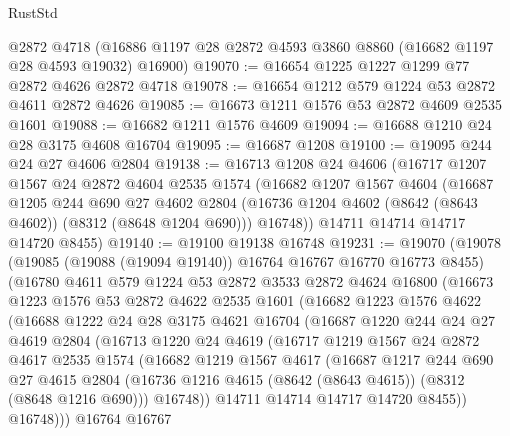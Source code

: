 \begin{lexlean}{RustStd}
\begin{coremodule}
    @2872
    @4718
    (@16886 @1197 @28 @2872 @4593 @3860 @8860 (@16682 @1197 @28 @4593 @19032) @16900)
@19070 := @16654 @1225 @1227 @1299 @77 @2872 @4626 @2872 @4718
@19078 := @16654 @1212 @579 @1224 @53 @2872 @4611 @2872 @4626
@19085 := @16673 @1211 @1576 @53 @2872 @4609 @2535 @1601
@19088 := @16682 @1211 @1576 @4609
@19094 := @16688 @1210 @24 @28 @3175 @4608 @16704
@19095 := @16687 @1208
@19100 := @19095 @244 @24 @27 @4606 @2804
@19138 := @16713
    @1208
    @24
    @4606
    (@16717
      @1207
      @1567
      @24
      @2872
      @4604
      @2535
      @1574
      (@16682
        @1207
        @1567
        @4604
        (@16687
          @1205
          @244
          @690
          @27
          @4602
          @2804
          (@16736 @1204 @4602 (@8642 (@8643 @4602)) (@8312 (@8648 @1204 @690)))
          @16748))
      @14711
      @14714
      @14717
      @14720
      @8455)
@19140 := @19100 @19138 @16748
@19231 := @19070
    (@19078
      (@19085 (@19088 (@19094 @19140)) @16764 @16767 @16770 @16773 @8455)
      (@16780
        @4611
        @579
        @1224
        @53
        @2872
        @3533
        @2872
        @4624
        @16800
        (@16673
          @1223
          @1576
          @53
          @2872
          @4622
          @2535
          @1601
          (@16682
            @1223
            @1576
            @4622
            (@16688
              @1222
              @24
              @28
              @3175
              @4621
              @16704
              (@16687
                @1220
                @244
                @24
                @27
                @4619
                @2804
                (@16713
                  @1220
                  @24
                  @4619
                  (@16717
                    @1219
                    @1567
                    @24
                    @2872
                    @4617
                    @2535
                    @1574
                    (@16682
                      @1219
                      @1567
                      @4617
                      (@16687
                        @1217
                        @244
                        @690
                        @27
                        @4615
                        @2804
                        (@16736 @1216 @4615 (@8642 (@8643 @4615)) (@8312 (@8648 @1216 @690)))
                        @16748))
                    @14711
                    @14714
                    @14717
                    @14720
                    @8455))
                @16748)))
          @16764
          @16767

\end{coremodule}
\end{lexlean}
